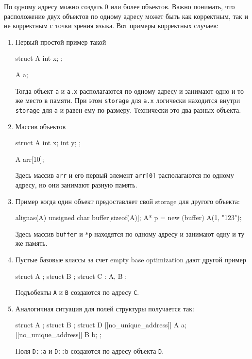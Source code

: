 \documentclass{article}
\begin{document}
По одному адресу можно создать 0 или более объектов.
Важно понимать, что расположение двух объектов по одному адресу может быть как корректным, так и не корректным с точки зрения языка.
Вот примеры корректных случаев:
\begin{enumerate}
\item Первый простой пример такой
\begin{cppcode}[numbers = none]
struct A {
  int x;
};

A a;
\end{cppcode}
Тогда объект \verb"a" и \verb"a.x" располагаются по одному адресу и занимают одно и то же место в памяти.
При этом \verb"storage" для \verb"a.x" логически находится внутри \verb"storage" для \verb"a" и равен ему по размеру.
Технически это два разных объекта.

\item Массив объектов
\begin{cppcode}[numbers = none]
struct A {
  int x;
  int y;
};

A arr[10];
\end{cppcode}
Здесь массив \verb"arr" и его первый элемент \verb"arr[0]" располагаются по одному адресу, но они занимают разную память.

\item Пример когда один объект предоставляет свой storage для другого объекта:
\begin{cppcode}[numbers = none]
alignas(A) unsigned char buffer[sizeof(A)];
A* p = new (buffer) A(1, "123");
\end{cppcode}
Здесь массив \verb"buffer" и \verb"*p" находятся по одному адресу и занимают одну и ту же память.

\item Пустые базовые классы за счет empty base optimization дают другой пример
\begin{cppcode}[numbers = none]
struct A {};
struct B {};
struct C : A, B {};
\end{cppcode}
Подъобекты \verb"A" и \verb"B" создаются по адресу \verb"C".

\item Аналогичная ситуация для полей структуры получается так:
\begin{cppcode}[numbers = none]
struct A {};
struct B {};
struct D {
  [[no_unique_address]] A a;
  [[no_unique_address]] B b;
};
\end{cppcode}
Поля \verb"D::a" и \verb"D::b" создаются по адресу объекта \verb"D".
\end{enumerate}
\end{document}
